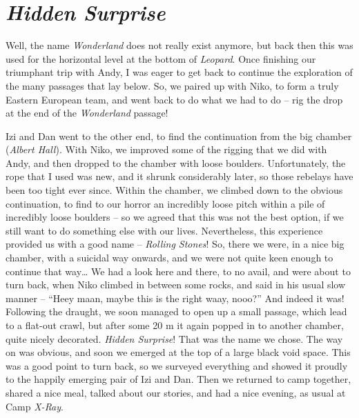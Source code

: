

\section{\texorpdfstring{\emph{Hidden
Surprise}}{Hidden Surprise}}

Well, the name \emph{Wonderland} does not really exist anymore, but back
then this was used for the horizontal level at the bottom of
\emph{Leopard}. Once finishing our triumphant trip with Andy, I was
eager to get back to continue the exploration of the many passages that
lay below. So, we paired up with Niko, to form a truly Eastern European
team, and went back to do what we had to do -- rig the drop at the end
of the \emph{Wonderland} passage!

Izi and Dan went to the other end, to find the continuation from the big
chamber (\emph{Albert Hall}). With Niko, we improved some of the rigging
that we did with Andy, and then dropped to the chamber with loose
boulders. Unfortunately, the rope that I used was new, and it shrunk
considerably later, so those rebelays have been too tight ever since.
Within the chamber, we climbed down to the obvious continuation, to find
to our horror an incredibly loose pitch within a pile of incredibly
loose boulders -- so we agreed that this was not the best option, if we
still want to do something else with our lives. Nevertheless, this
experience provided us with a good name -- \emph{Rolling Stones}! So,
there we were, in a nice big chamber, with a suicidal way onwards, and
we were not quite keen enough to continue that way\ldots{} We had a look
here and there, to no avail, and were about to turn back, when Niko
climbed in between some rocks, and said in his usual slow manner --
``Heey maan, maybe this is the right waay, nooo?'' And indeed it was!
Following the draught, we soon managed to open up a small passage, which
lead to a flat-out crawl, but after some 20 m it again popped in to
another chamber, quite nicely decorated. \emph{Hidden Surprise}! That
was the name we chose. The way on was obvious, and soon we emerged at
the top of a large black void space. This was a good point to turn back,
so we surveyed everything and showed it proudly to the happily emerging
pair of Izi and Dan. Then we returned to camp together, shared a nice
meal, talked about our stories, and had a nice evening, as usual at Camp
\emph{X-Ray}.

